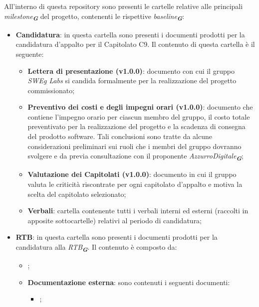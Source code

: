 \label{sec:repo_documentazione}
All’interno di questa repository sono presenti le cartelle relative alle principali \emph{milestone}\textsubscript{\textit{\textbf{G}}}
del progetto, contenenti le rispettive \emph{baseline}\textsubscript{\textit{\textbf{G}}}:
\begin{itemize}
    \item \textbf{Candidatura}:  in questa cartella sono presenti i documenti prodotti per la candidatura
    d’appalto per il Capitolato C9. Il contenuto di questa cartella è il seguente:
    \begin{itemize}
        \item \textbf{Lettera di presentazione (v1.0.0)}: documento con cui il gruppo \emph{SWEg Labs} si
        candida formalmente per la realizzazione del progetto commissionato;
        \item \textbf{Preventivo dei costi e degli impegni orari (v1.0.0)}: documento che contiene 
        l’impegno orario per ciascun membro del gruppo, il costo totale preventivato per la
        realizzazione del progetto e la scadenza di consegna del prodotto software. Tali
        conclusioni sono tratte da alcune considerazioni preliminari sui ruoli che i membri
        del gruppo dovranno svolgere e da previa consultazione con il proponente \emph{AzzurroDigitale}\textsubscript{\textit{\textbf{G}}};
        \item \textbf{Valutazione dei Capitolati (v1.0.0)}: documento in cui il gruppo valuta 
        le criticità riscontrate per ogni capitolato d’appalto e motiva la scelta del
        capitolato selezionato;
        \item \textbf{Verbali}: cartella contenente tutti i verbali interni ed esterni (raccolti in apposite sottocartelle)
        relativi al periodo di candidatura;
    \end{itemize}
    \item \textbf{RTB}: in questa cartella sono presenti i documenti prodotti per la candidatura alla \emph{RTB}\textsubscript{\textit{\textbf{G}}}.
    Il contenuto è composto da:
    \begin{itemize}
        \item {};
        \item \textbf{Documentazione esterna}: sono contenuti i seguenti documenti:
        \begin{itemize}
            \item {};

\end{itemize}
\end{itemize}
\end{itemize}
